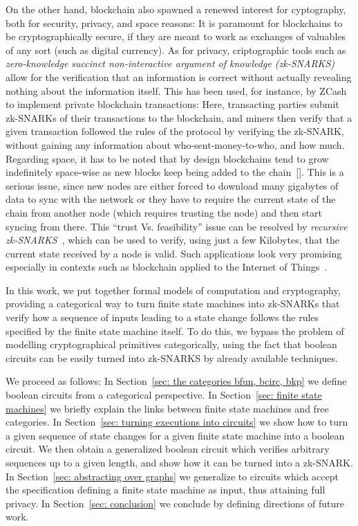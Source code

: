 \documentclass[preliminary,copyright,creativecommons,sharealike,noncommercial]{eptcs}
\begin{document}
On the other hand, blockchain also spawned a renewed interest for 
cyptography, both for security, privacy, and space reasons: It is 
paramount for blockchains to be cryptographically secure, if they are 
meant to work as exchanges of valuables of any sort (such as digital currency).
As for privacy, criptographic tools such as \emph{zero-knowledge 
succinct non-interactive argument of knowledge (zk-SNARKS)}~\cite{Ben-Sasson2013} allow for 
the verification that an information is correct without actually revealing nothing 
about the information itself. This has been used, for instance, by ZCash~\cite{Hopwood2019} to 
implement private blockchain transactions: Here, transacting parties submit 
zk-SNARKs of their transactions to the blockchain, and miners then verify that a given 
transaction followed the rules of the protocol by verifying the zk-SNARK, 
without gaining any information about who-sent-money-to-who, and 
how much. 
Regarding space, it has to be noted that by design blockchains tend to 
grow indefinitely space-wise as new blocks keep being added to the chain~[]. 
This is a serious issue, since new nodes are either forced to download many 
gigabytes of data to sync with the network or they have to require the current state 
of the chain from another node (which requires trusting the node) and then start 
syncing from there. This ``trust Vs. feasibility'' issue can be resolved by \emph{recursive 
zk-SNARKS}~\cite{Ben-Sasson2017}, which can be used to verify, using just a few Kilobytes, that the current 
state received by a node is valid. Such applications look very promising especially in 
contexts such as blockchain applied to the Internet of Things~\cite{Leiba2018}.

In this work, we put together formal models of computation and 
cryptography, providing a categorical way to turn finite state machines into zk-SNARKs 
that verify how a sequence of inputs leading to a state change follows the 
rules specified by the finite state machine itself. To do this, we bypass the problem 
of modelling cryptographical primitives categorically, using the 
fact that boolean circuits can be easily turned into zk-SNARKS by already 
available techniques. 

We proceed as follows: In Section~\ref{sec: the categories bfun, bcirc, bkp} we 
define boolean circuits from a categorical perspective. 
In Section~\ref{sec: finite state machines} we briefly 
explain the links between finite state machines and free categories. 
In Section~\ref{sec: turning executions into circuits} 
we show how to turn a given sequence of state changes 
for a given finite state machine into a boolean circuit. We then obtain a 
generalized boolean circuit which verifies arbitrary sequences up to 
a given length, and show how it can be turned into a zk-SNARK. 
In Section~\ref{sec: abstracting over graphs} we generalize to 
circuits which accept the specification defining a finite state machine 
as input, thus attaining full privacy. In Section~\ref{sec: conclusion} 
we conclude by defining directions of future work.
\end{document}
